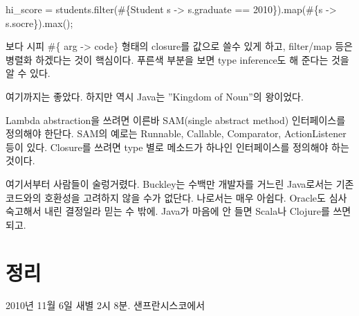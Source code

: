 \documentclass[a4paper]{article}
\begin{document}
hi\_score = students.filter(\#\{Student s -> s.graduate == 2010\}).map(\#\{s -> s.socre\}).max();
 
보다 시피 \#\{ arg -> code\} 형태의 closure를 값으로 쓸수 있게 하고,
filter/map 등은 병렬화 하겠다는 것이 핵심이다. 푸른색 부분을 보면 type
inference도 해 준다는 것을 알 수 있다.
 
여기까지는 좋았다. 하지만 역시 Java는 ”Kingdom of Noun”의 왕이었다.
 
Lambda abstraction을 쓰려면 이른바 SAM(single abstract method)
인터페이스를 정의해야 한단다.  SAM의 예로는 Runnable, Callable,
Comparator, ActionListener 등이 있다. Closure를 쓰려면 type 별로
메소드가 하나인 인터페이스를 정의해야 하는 것이다.
 
여기서부터 사람들이 술렁거렸다. Buckley는 수백만 개발자를 거느린
Java로서는 기존 코드와의 호환성을 고려하지 않을 수가 없단다. 나로서는
매우 아쉽다. Oracle도 심사 숙고해서 내린 결정일라 믿는 수 밖에. Java가
마음에 안 들면 Scala나 Clojure를 쓰면 되고.

\section{정리}

2010년 11월 6일 새별 2시 8분.
샌프란시스코에서
\end{document}
